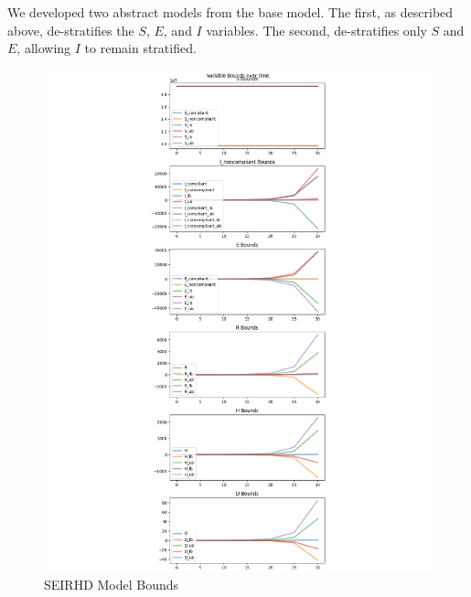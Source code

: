We developed two abstract models from the base model.  The first, as described above, de-stratifies the $S$, $E$, and $I$ variables.  The second, de-stratifies only $S$ and $E$, allowing $I$ to remain stratified.  

\begin{figure}
    \includegraphics[width=\linewidth]{fig/seirhd_bounds.pdf}
    \caption{\label{fig:seirhd-bounds} SEIRHD Model Bounds}
\end{figure}

